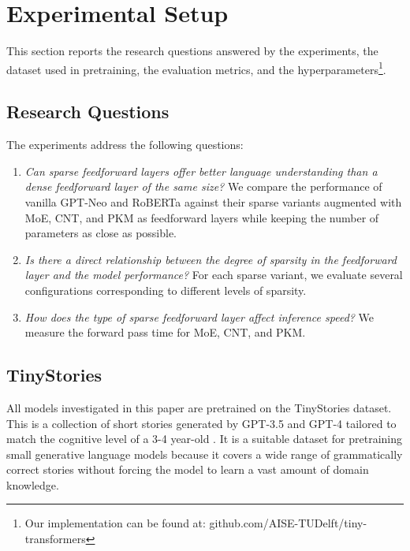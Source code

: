
\section{Experimental Setup}
\label{sec:setup}
This section reports the research questions answered by the experiments, the dataset used in pretraining, the evaluation metrics, and the hyperparameters\footnote{Our implementation can be found at: github.com/AISE-TUDelft/tiny-transformers}.


\subsection{Research Questions}
The experiments address the following questions:
\begin{enumerate}
    \item \textit{Can sparse feedforward layers offer better language understanding than a dense feedforward layer of the same size?} We compare the performance of vanilla GPT-Neo and RoBERTa against their sparse variants augmented with MoE, CNT, and PKM as feedforward layers while keeping the number of parameters as close as possible.
    \item \textit{Is there a direct relationship between the degree of sparsity in the feedforward layer and the model performance?} For each sparse variant, we evaluate several configurations corresponding to different levels of sparsity.
    \item \textit{How does the type of sparse feedforward layer affect inference speed?} We measure the forward pass time for MoE, CNT, and PKM.
\end{enumerate}

\subsection{TinyStories}
All models investigated in this paper are pretrained on the TinyStories dataset. This is a collection of short stories generated by GPT-3.5 and GPT-4 tailored to match the cognitive level of a 3-4 year-old \cite{eldan_tinystories_2023}. It is a suitable dataset for pretraining small generative language models because it covers a wide range of grammatically correct stories without forcing the model to learn a vast amount of domain knowledge. 

